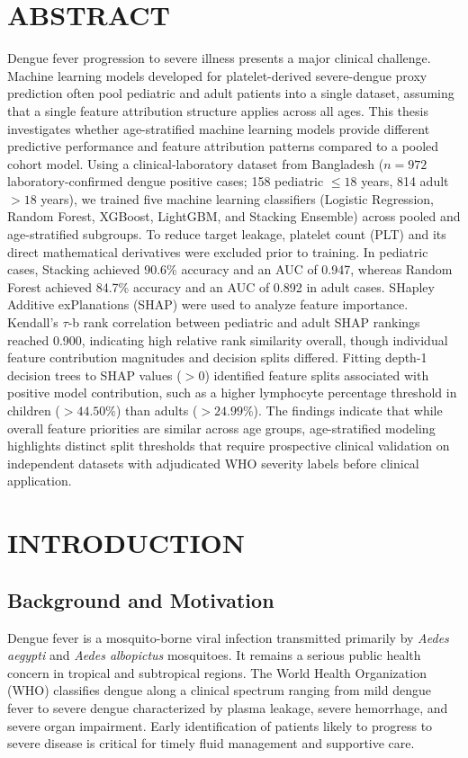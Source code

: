 \documentclass[12pt, a4paper]{report}
\begin{document}
\chapter*{ABSTRACT}
Dengue fever progression to severe illness presents a major clinical challenge. Machine learning models developed for platelet-derived severe-dengue proxy prediction often pool pediatric and adult patients into a single dataset, assuming that a single feature attribution structure applies across all ages. This thesis investigates whether age-stratified machine learning models provide different predictive performance and feature attribution patterns compared to a pooled cohort model. Using a clinical-laboratory dataset from Bangladesh ($n=972$ laboratory-confirmed dengue positive cases; 158 pediatric $\le 18$ years, 814 adult $> 18$ years), we trained five machine learning classifiers (Logistic Regression, Random Forest, XGBoost, LightGBM, and Stacking Ensemble) across pooled and age-stratified subgroups. To reduce target leakage, platelet count (PLT) and its direct mathematical derivatives were excluded prior to training. In pediatric cases, Stacking achieved 90.6\% accuracy and an AUC of 0.947, whereas Random Forest achieved 84.7\% accuracy and an AUC of 0.892 in adult cases. SHapley Additive exPlanations (SHAP) were used to analyze feature importance. Kendall's $\tau$-b rank correlation between pediatric and adult SHAP rankings reached 0.900, indicating high relative rank similarity overall, though individual feature contribution magnitudes and decision splits differed. Fitting depth-1 decision trees to SHAP values ($> 0$) identified feature splits associated with positive model contribution, such as a higher lymphocyte percentage threshold in children ($> 44.50\%$) than adults ($> 24.99\%$). The findings indicate that while overall feature priorities are similar across age groups, age-stratified modeling highlights distinct split thresholds that require prospective clinical validation on independent datasets with adjudicated WHO severity labels before clinical application.

\tableofcontents
\listoffigures
\listoftables

\clearpage
{}

\chapter{INTRODUCTION}

\section{Background and Motivation}
Dengue fever is a mosquito-borne viral infection transmitted primarily by \textit{Aedes aegypti} and \textit{Aedes albopictus} mosquitoes. It remains a serious public health concern in tropical and subtropical regions. The World Health Organization (WHO) classifies dengue along a clinical spectrum ranging from mild dengue fever to severe dengue characterized by plasma leakage, severe hemorrhage, and severe organ impairment. Early identification of patients likely to progress to severe disease is critical for timely fluid management and supportive care.
\end{document}
